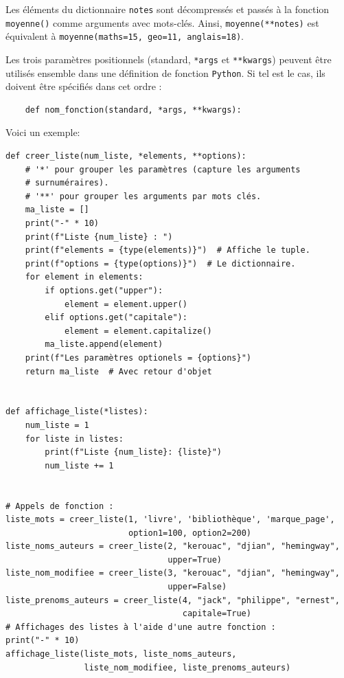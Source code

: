 \documentclass[a4paper,11pt]{book}
\begin{document}
Les éléments du dictionnaire \texttt{notes} sont décompressés et passés à la fonction \texttt{moyenne()} comme arguments avec mots-clés. Ainsi, \texttt{moyenne(**notes)} est équivalent à \texttt{moyenne(maths=15, geo=11, anglais=18)}.
\medskip

Les trois paramètres positionnels (standard, \texttt{*args} et \texttt{**kwargs}) peuvent être utilisés ensemble dans une définition de fonction \texttt{Python}. Si tel est le cas, ils doivent être spécifiés dans cet ordre :
\begin{verbatim}
    def nom_fonction(standard, *args, **kwargs):
\end{verbatim}
\medskip

Voici un exemple:
\begin{lstlisting}[caption=Paramètres mixées]
def creer_liste(num_liste, *elements, **options):
    # '*' pour grouper les paramètres (capture les arguments 
    # surnuméraires).
    # '**' pour grouper les arguments par mots clés.
    ma_liste = []
    print("-" * 10)
    print(f"Liste {num_liste} : ")
    print(f"elements = {type(elements)}")  # Affiche le tuple.
    print(f"options = {type(options)}")  # Le dictionnaire.
    for element in elements:
        if options.get("upper"):
            element = element.upper()
        elif options.get("capitale"):
            element = element.capitalize()
        ma_liste.append(element)
    print(f"Les paramètres optionels = {options}")
    return ma_liste  # Avec retour d'objet


def affichage_liste(*listes):
    num_liste = 1
    for liste in listes:
        print(f"Liste {num_liste}: {liste}")
        num_liste += 1


# Appels de fonction :
liste_mots = creer_liste(1, 'livre', 'bibliothèque', 'marque_page',
                         option1=100, option2=200)
liste_noms_auteurs = creer_liste(2, "kerouac", "djian", "hemingway",
                                 upper=True)
liste_nom_modifiee = creer_liste(3, "kerouac", "djian", "hemingway",
                                 upper=False)
liste_prenoms_auteurs = creer_liste(4, "jack", "philippe", "ernest",
                                    capitale=True)
# Affichages des listes à l'aide d'une autre fonction :
print("-" * 10)
affichage_liste(liste_mots, liste_noms_auteurs,
                liste_nom_modifiee, liste_prenoms_auteurs)
\end{lstlisting}
\medskip
\end{document}
